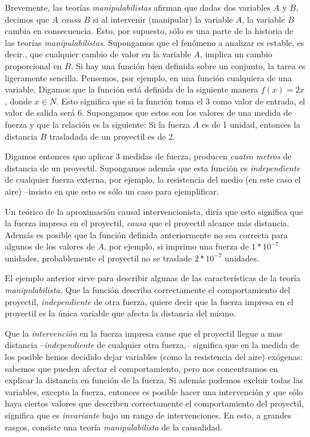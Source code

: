 Brevemente, las teorías \emph{manipulabilistas} afirman que dadas dos variables $A$ y $B$, decimos que $A$ \emph{causa} $B$ si al intervenir (manipular) la variable $A$, la variable $B$ cambia en consecuencia.
Esto, por supuesto, sólo es una parte de la historia de las teorías
\emph{manipulabilistas}. Supongamos que el fenómeno a analizar es
estable, es decir., que cualquier cambio de valor en la variable $A$,
implica un cambio proporcional en $B$. Si hay una función bien
definida sobre un conjunto, la tarea es ligeramente sencilla.
Pensemos, por ejemplo, en una función cualquiera de una variable.
Digamos que la función está definida de la siguiente manera $f(x) =
	2x$, donde $x \in {N}$. Esto significa que si la función toma el $3$
como valor de entrada, el valor de salida será $6$. Supongamos que
estos son los valores de una medida de fuerza y que la relación es la
siguiente: Si la fuerza $A$ es de 1 unidad, entonces la distancia $B$
trasladada de un proyectil es de 2.

Digamos entonces que aplicar 3 medidas de fuerza, producen
\emph{cuatro metros} de distancia de un proyectil. Supongamos además
que esta función es \emph{independiente} de cualquier fuerza externa,
por ejemplo, la resistencia del medio (en este caso el aire)
--insisto en que esto es sólo un caso para ejemplificar.

Un teórico de la aproximación causal intervencionista, diría que
esto significa que la fuerza impresa en el proyectil, \emph{causa}
que el proyectil alcance más distancia. Además es posible que la
función definida anteriormente no sea correcta para algunos de los
valores de $A$, por ejemplo, si imprimo una fuerza de $1*10^{-7}$
unidades, probablemente el proyectil no se traslade $2*10^{-7}$
unidades.

El ejemplo anterior sirve para describir algunas de las características de la teoría \emph{manipulabilista.}
Que la función describa correctamente el comportamiento del
proyectil, \emph{independiente} de otra fuerza, quiere decir que la
fuerza impresa en el proyectil es la única variable que afecta la
distancia del mismo.

Que la \emph{intervención} en la fuerza impresa cause que el
proyectil llegue a mas distancia --\emph{independiente} de cualquier
otra fuerza,-- significa que en la medida de los posible hemos
decidido dejar variables (como la resistencia del aire) exógenas:
sabemos que pueden afectar el comportamiento, pero nos concentramos
en explicar la distancia en función de la fuerza. Si además podemos
excluir todas las variables, excepto la fuerza, entonces es posible
hacer una intervención  y que sólo haya ciertos
valores que describen correctamente el comportamiento del proyectil,
significa que es \emph{invariante} bajo un rango de intervenciones.
En esto, a grandes rasgos, consiste una teoría \emph{manipulabilista}
de la causalidad.

